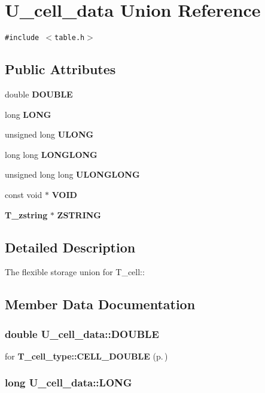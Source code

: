 \section{U\_\-cell\_\-data Union Reference}
\label{unionU__cell__data}
{\tt \#include $<$table.h$>$}

\subsection*{Public Attributes}
\begin{CompactItemize}
\item 
double {\bf DOUBLE}
\item 
long {\bf LONG}
\item 
unsigned long {\bf ULONG}
\item 
long long {\bf LONGLONG}
\item 
unsigned long long {\bf ULONGLONG}
\item 
const void $\ast$ {\bf VOID}
\item 
{\bf T\_\-zstring} $\ast$ {\bf ZSTRING}
\end{CompactItemize}


\subsection{Detailed Description}
The flexible storage union for T\_\-cell:: 



\subsection{Member Data Documentation}
\subsubsection{\setlength{\rightskip}{0pt plus 5cm}double U\_\-cell\_\-data::DOUBLE}\label{unionU__cell__data_m0}


for {\bf T\_\-cell\_\-type::CELL\_\-DOUBLE} {\rm (p.\,\pageref{table_8h_a37a15})} 
\subsubsection{\setlength{\rightskip}{0pt plus 5cm}long U\_\-cell\_\-data::LONG}\label{unionU__cell__data_m1}


